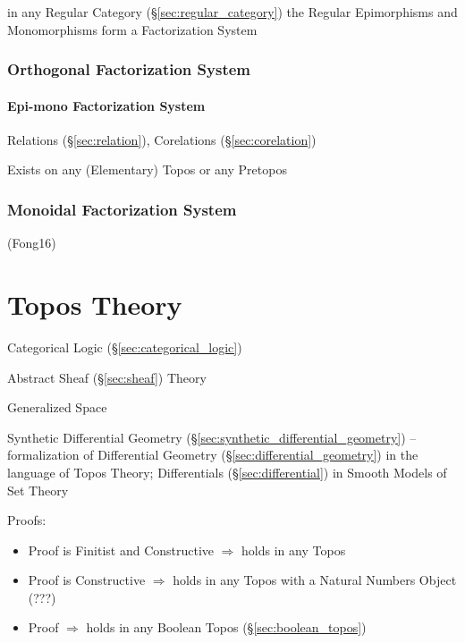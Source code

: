 in any Regular Category (\S\ref{sec:regular_category}) the Regular
Epimorphisms and Monomorphisms form a Factorization System



\subsubsection{Orthogonal Factorization System}
\label{sec:orthogonal_factorization_system}

\paragraph{Epi-mono Factorization System}
\label{sec:epimono_factorization}\hfill

Relations (\S\ref{sec:relation}), Corelations (\S\ref{sec:corelation})

Exists on any (Elementary) Topos or any Pretopos %



\subsubsection{Monoidal Factorization System}
\label{sec:monoidal_factorization_system}

(Fong16)



\section{Topos Theory}\label{sec:topos_theory}

Categorical Logic (\S\ref{sec:categorical_logic})

Abstract Sheaf (\S\ref{sec:sheaf}) Theory

Generalized Space

\fist Synthetic Differential Geometry
(\S\ref{sec:synthetic_differential_geometry}) -- formalization of Differential
Geometry (\S\ref{sec:differential_geometry}) in the language of Topos Theory;
Differentials (\S\ref{sec:differential}) in Smooth Models of Set Theory

Proofs:
\begin{itemize}
  \item Proof is Finitist and Constructive $\Rightarrow$ holds in any
    Topos
  \item Proof is Constructive $\Rightarrow$ holds in any Topos with a
    Natural Numbers Object (???)
  \item Proof $\Rightarrow$ holds in any Boolean Topos
    (\S\ref{sec:boolean_topos})
\end{itemize}

